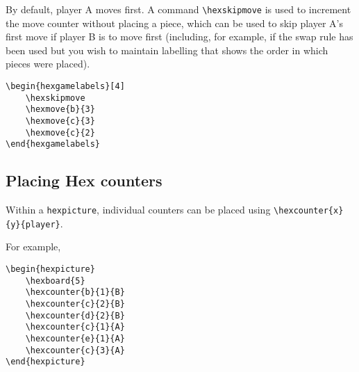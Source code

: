 \documentclass[a4paper,12pt]{article}
\begin{document}
    \begin{hexgamelabels}[5]
    \end{hexgamelabels}
    
    By default, player A moves first. A command \verb|\hexskipmove| is used to increment the move counter without placing a piece, which can be used to skip player A's first move if player B is to move first (including, for example, if the swap rule has been used but you wish to maintain labelling that shows the order in which pieces were placed). 
    
    \begin{verbatim}\begin{hexgamelabels}[4]
    \hexskipmove
    \hexmove{b}{3}
    \hexmove{c}{3}
    \hexmove{c}{2}
\end{hexgamelabels}\end{verbatim}
    
    \begin{hexgamelabels}[4]
        \hexskipmove
    \end{hexgamelabels}
    
    \subsection{Placing Hex counters}
    
    Within a \verb|hexpicture|, individual counters can be placed using \verb|\hexcounter{x}{y}{player}|. 
    
    For example,
    
    \begin{verbatim}\begin{hexpicture}
    \hexboard{5}
    \hexcounter{b}{1}{B}
    \hexcounter{c}{2}{B}
    \hexcounter{d}{2}{B}
    \hexcounter{c}{1}{A}
    \hexcounter{e}{1}{A}
    \hexcounter{c}{3}{A}
\end{hexpicture}\end{verbatim}
    
    \begin{hexpicture}
    \end{hexpicture}
\end{document}
